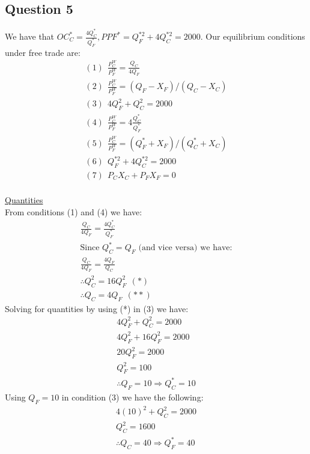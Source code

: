 \documentclass{article}
\begin{document}
\par \vspace{0.8em}
\subsection{Question 5}

We have that $OC_{C}^{*} = \tfrac{4Q_{C}^{*}}{Q_{F}^{*}}, PPF^{*} = Q_{F}^{*2} + 4Q_{C}^{*2} = 2000$. Our equilibrium conditions under free trade are:
\begin{gather*}
  (1) \ \ \tfrac{P_{C}^{W}}{P_{F}^{W}} = \tfrac{Q_{C}}{4Q_{F}} \\
  (2) \ \ \tfrac{P_{C}^{W}}{P_{F}^{W}} = (Q_{F} - X_{F})/(Q_{C} - X_{C}) \\
  (3) \ \ 4Q_{F}^{2} + Q_{C}^{2} = 2000 \\
  (4) \ \ \tfrac{P_{C}^{W}}{P_{F}^{W}} = 4 \tfrac{Q_{C}^{*}}{Q_{F}^{*}} \\
  (5) \ \ \tfrac{P_{C}^{W}}{P_{F}^{W}} = (Q_{F}^{*} + X_{F})/(Q^{*}_{C} + X_{C}) \\
  (6) \ \ Q_{F}^{*2} + 4Q_{C}^{*2} = 2000 \\
  (7) \ \ P_{C}X_{C} + P_{F}X_{F} = 0 \\
\end{gather*}

\underline{Quantities} \\
From conditions (1) and (4) we have:
\begin{gather*}
  \tfrac{Q_{C}}{4Q_{F}} = \tfrac{4Q_{C}^{*}}{Q_{F}^{*}} \\
  \text{Since } Q_{C}^{*} = Q_{F} \text{ (and vice versa) we have:} \\
  \tfrac{Q_{C}}{4Q_{F}} = \tfrac{4Q_{F}}{Q_{C}} \\
  \therefore Q_{C}^{2} = 16Q_{F}^{2} \ \ (*)  \\
  \therefore Q_{C} = 4Q_{F} \ \ (**)
\end{gather*}
Solving for quantities by using (*) in (3) we have:
\begin{gather*}
  4Q_{F}^{2} + Q_{C}^{2} = 2000 \\
  4Q_{F}^{2} + 16Q_{F}^{2} = 2000 \\
  20Q_{F}^{2} = 2000 \\
  Q_{F}^{2} = 100 \\
  \therefore Q_{F} = 10 \Rightarrow Q_{C}^{*} = 10
\end{gather*}
Using $Q_{F} = 10$ in condition (3) we have the following:
\begin{gather*}
  4(10)^{2} + Q_{C}^{2} = 2000 \\
  Q_{C}^{2} = 1600 \\
  \therefore Q_{C} = 40 \Rightarrow Q_{F}^{*} = 40
\end{gather*}
\end{document}
